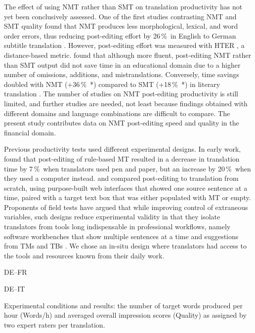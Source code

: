 \documentclass[11pt]{article}
\newcommand{\percent}{\,\%\ }
\begin{document}
The effect of using NMT rather than SMT on translation productivity has not yet been conclusively assessed. One of the first studies contrasting NMT and SMT quality found that NMT produces less morphological, lexical, and word order errors, thus reducing post-editing effort by 26\percent in English to German subtitle translation \citep{Bentivogli2016}. However, post-editing effort was measured with HTER \citep{Snover2006}, a distance-based metric. \citet{Castilho2017} found that although more fluent, post-editing NMT rather than SMT output did not save time in an educational domain due to a higher number of omissions, additions, and mistranslations. Conversely, time savings doubled with NMT (+36\percent*) compared to SMT (+18\percent*) in literary translation \citep{Toral2018Literary}. The number of studies on NMT post-editing productivity is still limited, and further studies are needed, not least because findings obtained with different domains and language combinations are difficult to compare. The present study contributes data on NMT post-editing speed and quality in the financial domain.

Previous productivity tests used different experimental designs. In early work, \citet{Krings1994} found that post-editing of rule-based MT resulted in a decrease in translation time by 7\percent when translators used pen and paper, but an increase by 20\percent when they used a computer instead. \citet{PlittMasselot2010} and \citet{Green2013} compared post-editing to translation from scratch, using purpose-built web interfaces that showed one source sentence at a time, paired with a target text box that was either populated with MT or empty. Proponents of field tests have argued that while improving control of extraneous variables, such designs reduce experimental validity in that they isolate translators from tools long indispensable in professional workflows, namely software workbenches that show multiple sentences at a time and suggestions from TMs and TBs \citep{Federico2012,Laeubli2013}. We chose an in-situ design where translators had access to the tools and resources known from their daily work.

\begin{table*}[t]
    \centering
    \begin{subtable}[b]{0.48\textwidth}
        \centering
        \renewcommand{\arraystretch}{1.2}
    \fontsize{10.1pt}{10.1pt}\selectfont
        
        \caption{DE--FR}
        \label{tab:ResultsFR}
    \end{subtable}
    \quad
    \begin{subtable}[b]{0.48\textwidth}
        \centering
        \renewcommand{\arraystretch}{1.2}
        \fontsize{10.1pt}{10.1pt}\selectfont
        
        \caption{DE--IT}
        \label{tab:ResultsIT}
    \end{subtable}
    \caption{Experimental conditions and results: the number of target words produced per hour (Words/h) and averaged overall impression scores (Quality) as assigned by two expert raters per translation.}
    \label{tab:Results}
\end{table*}
\end{document}
